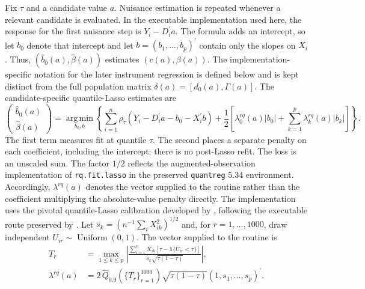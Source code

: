 Fix $\tau$ and a candidate value $a$. Nuisance estimation is repeated whenever a relevant candidate is evaluated. In the executable implementation used here, the response for the first nuisance step is $Y_i-D_i^{\prime}a$. The formula adds an intercept, so let $b_0$ denote that intercept and let $b=(b_1,\ldots,b_p)^{\prime}$ contain only the slopes on $X_i$. Thus, $(\widehat b_0(a),\widehat\beta(a))$ estimates $(c(a),\beta(a))$. The implementation-specific notation for the later instrument regression is defined below and is kept distinct from the full population matrix $\delta(a)=[d_0(a),\Gamma(a)]$. The candidate-specific quantile-Lasso estimates are
\begin{equation}
    \begin{pmatrix}
        \widehat b_0(a)\\
        \widehat\beta(a)
    \end{pmatrix}
    =
    \operatorname*{arg\,min}_{b_0,b}
    \left\{
        \sum_{i=1}^{n}
        \rho_{\tau}\!\left(
            Y_i-D_i^{\prime}a-b_0-X_i^{\prime}b
        \right)
        +
        \frac{1}{2}\left[
            \lambda_0^{rq}(a)|b_0|
            +\sum_{k=1}^{p}\lambda_k^{rq}(a)|b_k|
        \right]
    \right\}.
    \label{eq:beta-hat-dml}
\end{equation}
The first term measures fit at quantile $\tau$. The second places a separate penalty on each coefficient, including the intercept; there is no post-Lasso refit. The loss is an unscaled sum. The factor $1/2$ reflects the augmented-observation implementation of \texttt{rq.fit.lasso} in the preserved \texttt{quantreg} 5.34 environment. Accordingly, $\lambda^{rq}(a)$ denotes the vector supplied to the routine rather than the coefficient multiplying the absolute-value penalty directly. The implementation uses the pivotal quantile-Lasso calibration developed by \textcite{belloni_chernozhukov_2011}, following the executable route preserved by \textcite{chen_huang_tien_2021}. Let $s_k=(n^{-1}\sum_iX_{ik}^2)^{1/2}$ and, for $r=1,\ldots,1000$, draw independent $U_{ir}\sim\operatorname{Uniform}(0,1)$. The vector supplied to the routine is
\begin{equation}
    \begin{aligned}
        T_r
        &=
        \max_{1\leq k\leq p}
        \left|
            \frac{
                \sum_{i=1}^{n}X_{ik}
                \left[\tau-\mathbf{1}\{U_{ir}<\tau\}\right]
            }{
                s_k\sqrt{\tau(1-\tau)}
            }
        \right|,\\
        \lambda^{rq}(a)
        &=
        2\,\widehat Q_{0.9}\!\left(\{T_r\}_{r=1}^{1000}\right)
        \sqrt{\tau(1-\tau)}
        (1,s_1,\ldots,s_p)^{\prime}.
    \end{aligned}
    \label{eq:bc-pivotal-penalty}
\end{equation}
